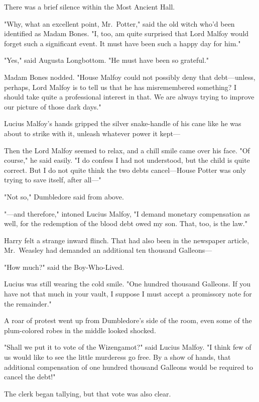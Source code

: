 There was a brief silence within the Most Ancient Hall.

"Why, what an excellent point, Mr.~Potter," said the old witch who'd been 
identified as Madam Bones. "I, too, am quite surprised that Lord Malfoy would 
forget such a significant event. It must have been such a happy day for him."

"Yes," said Augusta Longbottom. "He must have been so grateful."

Madam Bones nodded. "House Malfoy could not possibly deny that debt---unless, 
perhaps, Lord Malfoy is to tell us that he has misremembered something? I 
should take quite a professional interest in that. We are always trying to 
improve our picture of those dark days."

Lucius Malfoy's hands gripped the silver snake-handle of his cane like he was 
about to strike with it, unleash whatever power it kept---

Then the Lord Malfoy seemed to relax, and a chill smile came over his face. "Of 
course," he said easily. "I do confess I had not understood, but the child is 
quite correct. But I do not quite think the two debts cancel---House Potter was 
only trying to save itself, after all---"

"Not so," Dumbledore said from above.

"---and therefore," intoned Lucius Malfoy, "I demand monetary compensation as 
well, for the redemption of the blood debt owed my son. That, too, is the law."

Harry felt a strange inward flinch. That had also been in the newspaper 
article, Mr.~Weasley had demanded an additional ten thousand Galleons---

"How much?" said the Boy-Who-Lived.

Lucius was still wearing the cold smile. "One hundred thousand Galleons. If you 
have not that much in your vault, I suppose I must accept a promissory note for 
the remainder."

A roar of protest went up from Dumbledore's side of the room, even some of the 
plum-colored robes in the middle looked shocked.

"Shall we put it to vote of the Wizengamot?" said Lucius Malfoy. "I think few 
of us would like to see the little murderess go free. By a show of hands, that 
additional compensation of one hundred thousand Galleons would be required to 
cancel the debt!"

The clerk began tallying, but that vote was also clear.

